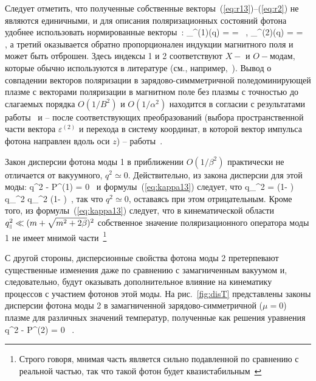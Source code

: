Следует отметить, что полученные собственные 
векторы~(\ref{eq:r13})--(\ref{eq:r2}) не являются единичными, и для описания 
поляризационных состояний фотона удобнее использовать нормированные векторы~\cite{RumyantsevDouble:2026}:
%
\beq
\label{eq:epsilon}
\varepsilon_\alpha^{(1)}(q) =  = 
 \, , \quad
\varepsilon_\alpha^{(2)}(q) =  = 
\, ,
\eeq
\noindent а третий оказывается обратно пропорционален индукции магнитного поля и может быть отброшен. Здесь индексы 1 и 2 соответствуют $X-$ и $O-$модам, которые обычно используются в литературе (см., например,~\cite{Mushtukov:2016}). Вывод о совпадении векторов поляризации в зарядово-симмметричной поледоминирующей плазме с векторами поляризации в магнитном поле без плазмы с точностью до слагаемых порядка $O(1/B^2)$ и $O(1/\alpha^2)$ находится в согласии с результатами работы~\cite{Shabad:1988} и -- после соответствующих преобразований (выбора пространственной части вектора $\varepsilon^{(2)}$ и перехода в систему координат, в которой вектор импульса фотона направлен вдоль оси $z$) -- работы~\cite{Potekhin:2004}.

Закон дисперсии фотона моды 1 в приближении $O(1/\beta^2)$ практически не отличается от вакуумного, $q^2 \simeq 0$. Действительно, из закона дисперсии для этой моды:
%
\beq
q^2 - {\cal P}^{(1)} = 0 \, 
\label{disper1}
\eeq
\noindent и формулы~(\ref{eq:kappa13}) следует, что
%
\beq
q_{\mprl}^2 = \left (1- \frac{\alpha}{3\pi}  \right) \, q_{\mprp}^2  
\simeq q_{\mprp}^2 \left (1- \frac{\alpha}{3\pi} \right)\, , 
\label{disper12}
\eeq
\noindent так что $q^2 \simeq 0$, оставаясь при этом отрицательным. Кроме того, 
из формулы~(\ref{eq:kappa13}) следует, что в кинематической области 
$q^2_{\mbox{\tiny $\|$}} \ll (m+\sqrt{m^2+2 \beta})^2$ собственное значение поляризационного 
оператора моды 1 не имеет мнимой части~\footnote{Строго говоря, мнимая часть 
является сильно подавленной по сравнению с реальной частью, так что такой фотон 
будет квазистабильным~\cite{YarkovPhotDampPAN:2022}}


С другой стороны, дисперсионные свойства фотона моды 2  претерпевают 
существенные изменения даже по сравнению с замагниченным вакуумом и, 
следовательно, будут оказывать дополнительное влияние на кинематику процессов с 
участием фотонов этой моды. На рис.~\ref{fig:disT} представлены законы 
дисперсии фотона моды 2 в замагниченной зарядово-симметричной ($\mu=0$) плазме 
для различных значений температур, полученные как 
решения уравнения
%
\beq
q^2 - {\cal P}^{(2)} = 0 \, .
\label{disper}
\eeq

